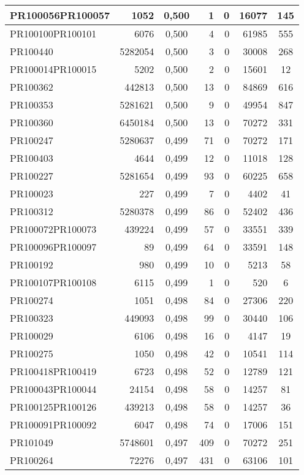 \begin{center}
\begin{longtable}{lr|c|rrr|c}
	PR100056PR100057 & 1052 & 0,500 & 1 & 0 & 16077 & 145 \\ \hline
	PR100100PR100101 & 6076 & 0,500 & 4 & 0 & 61985 & 555 \\ \hline
	PR100440 & 5282054 & 0,500 & 3 & 0 & 30008 & 268 \\ \hline
	PR100014PR100015 & 5202 & 0,500 & 2 & 0 & 15601 & 12 \\ \hline
	PR100362 & 442813 & 0,500 & 13 & 0 & 84869 & 616 \\ \hline
	PR100353 & 5281621 & 0,500 & 9 & 0 & 49954 & 847 \\ \hline
	PR100360 & 6450184 & 0,500 & 13 & 0 & 70272 & 331 \\ \hline
	PR100247 & 5280637 & 0,499 & 71 & 0 & 70272 & 171 \\ \hline
	PR100403 & 4644 & 0,499 & 12 & 0 & 11018 & 128 \\ \hline
	PR100227 & 5281654 & 0,499 & 93 & 0 & 60225 & 658 \\ \hline
	PR100023 & 227 & 0,499 & 7 & 0 & 4402 & 41 \\ \hline
	PR100312 & 5280378 & 0,499 & 86 & 0 & 52402 & 436 \\ \hline
	PR100072PR100073 & 439224 & 0,499 & 57 & 0 & 33551 & 339 \\ \hline
	PR100096PR100097 & 89 & 0,499 & 64 & 0 & 33591 & 148 \\ \hline
	PR100192 & 980 & 0,499 & 10 & 0 & 5213 & 58 \\ \hline
	PR100107PR100108 & 6115 & 0,499 & 1 & 0 & 520 & 6 \\ \hline
	PR100274 & 1051 & 0,498 & 84 & 0 & 27306 & 220 \\ \hline
	PR100323 & 449093 & 0,498 & 99 & 0 & 30440 & 106 \\ \hline
	PR100029 & 6106 & 0,498 & 16 & 0 & 4147 & 19 \\ \hline
	PR100275 & 1050 & 0,498 & 42 & 0 & 10541 & 114 \\ \hline
	PR100418PR100419 & 6723 & 0,498 & 52 & 0 & 12789 & 121 \\ \hline
	PR100043PR100044 & 24154 & 0,498 & 58 & 0 & 14257 & 81 \\ \hline
	PR100125PR100126 & 439213 & 0,498 & 58 & 0 & 14257 & 36 \\ \hline
	PR100091PR100092 & 6047 & 0,498 & 74 & 0 & 17006 & 151 \\ \hline
	PR101049 & 5748601 & 0,497 & 409 & 0 & 70272 & 251 \\ \hline
	PR100264 & 72276 & 0,497 & 431 & 0 & 63106 & 101 \\ \hline

\end{longtable}
\end{center}
